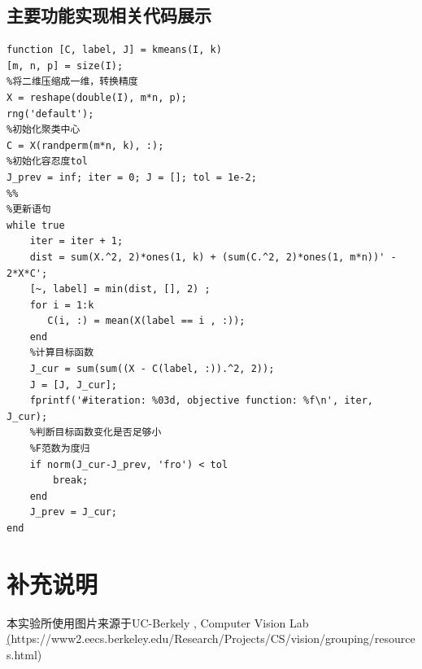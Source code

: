 \documentclass{article}
\begin{document}
\subsection{主要功能实现相关代码展示}
\begin{lstlisting}
function [C, label, J] = kmeans(I, k)
[m, n, p] = size(I);
%将二维压缩成一维，转换精度
X = reshape(double(I), m*n, p);
rng('default');
%初始化聚类中心
C = X(randperm(m*n, k), :);
%初始化容忍度tol
J_prev = inf; iter = 0; J = []; tol = 1e-2;
%% 
%更新语句
while true
    iter = iter + 1;
    dist = sum(X.^2, 2)*ones(1, k) + (sum(C.^2, 2)*ones(1, m*n))' - 2*X*C';
    [~, label] = min(dist, [], 2) ;
    for i = 1:k
       C(i, :) = mean(X(label == i , :));
    end
    %计算目标函数
    J_cur = sum(sum((X - C(label, :)).^2, 2));
    J = [J, J_cur];
    fprintf('#iteration: %03d, objective function: %f\n', iter, J_cur);
    %判断目标函数变化是否足够小
    %F范数为度归
    if norm(J_cur-J_prev, 'fro') < tol
        break;
    end
    J_prev = J_cur;
end

\end{lstlisting}
 \section{补充说明}
 本实验所使用图片来源于UC-Berkely , Computer Vision Lab\\
 \href{https://www2.eecs.berkeley.edu/Research/Projects/CS/vision/grouping/resources.html}(https://www2.eecs.berkeley.edu/Research/Projects/CS/vision/grouping/resources.html)
\end{document}
